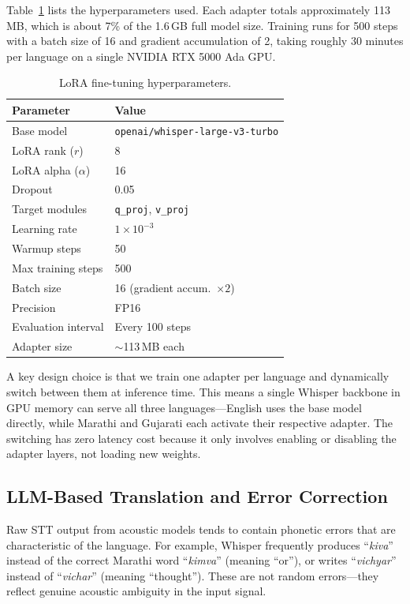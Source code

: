 Table~\ref{tab:lora_config} lists the hyperparameters used. Each adapter totals approximately 113\,MB, which is about 7\% of the 1.6\,GB full model size. Training runs for 500 steps with a batch size of 16 and gradient accumulation of 2, taking roughly 30 minutes per language on a single NVIDIA RTX 5000 Ada GPU.

\begin{table}[t]
\centering
\caption{LoRA fine-tuning hyperparameters.}
\label{tab:lora_config}
\begin{tabular}{ll}
\toprule
\textbf{Parameter} & \textbf{Value} \\
\midrule
Base model & \texttt{openai/whisper-large-v3-turbo} \\
LoRA rank ($r$) & 8 \\
LoRA alpha ($\alpha$) & 16 \\
Dropout & 0.05 \\
Target modules & \texttt{q\_proj}, \texttt{v\_proj} \\
Learning rate & $1 \times 10^{-3}$ \\
Warmup steps & 50 \\
Max training steps & 500 \\
Batch size & 16 (gradient accum.\ $\times 2$) \\
Precision & FP16 \\
Evaluation interval & Every 100 steps \\
Adapter size & $\sim$113\,MB each \\
\bottomrule
\end{tabular}
\end{table}

A key design choice is that we train one adapter per language and dynamically switch between them at inference time. This means a single Whisper backbone in GPU memory can serve all three languages---English uses the base model directly, while Marathi and Gujarati each activate their respective adapter. The switching has zero latency cost because it only involves enabling or disabling the adapter layers, not loading new weights.

\subsection{LLM-Based Translation and Error Correction}
\label{sec:llm}

Raw STT output from acoustic models tends to contain phonetic errors that are characteristic of the language. For example, Whisper frequently produces ``\textit{kiva}'' instead of the correct Marathi word ``\textit{kimva}'' (meaning ``or''), or writes ``\textit{vichyar}'' instead of ``\textit{vichar}'' (meaning ``thought''). These are not random errors---they reflect genuine acoustic ambiguity in the input signal.

